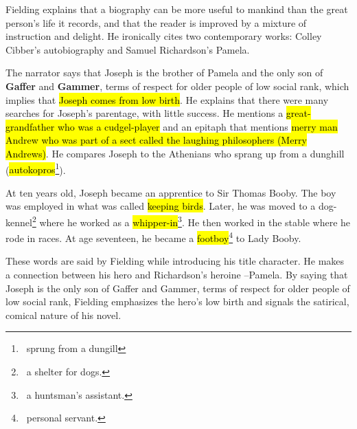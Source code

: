 \documentclass[12pt, a4paper]{article}
\begin{document}

Fielding explains that a biography can be more
useful to mankind than the great person's life it records, and that the reader is
improved by a mixture of instruction and delight. He ironically cites two contemporary works: 
Colley Cibber’s autobiography and Samuel Richardson’s Pamela.


\ind The narrator says that Joseph is the brother of Pamela and the only son of \textbf{Gaffer} and \textbf{Gammer},
terms of respect for older people of low social rank, which implies that \hl{Joseph comes from low birth}.
He explains that there were many searches for Joseph’s parentage, with little success. He mentions
a \hl{great-grandfather who was a cudgel-player} and an epitaph that mentions \hl{merry man Andrew 
who was part of a sect called the laughing philosophers (Merry Andrews)}. He compares Joseph 
to the Athenians who sprang up from a dunghill (\hl{autokopros}\footnote{\, sprung from a dungill}).


\ind At ten years old, Joseph became an apprentice to Sir Thomas Booby. The boy was employed in what 
was called \hl{keeping birds}. Later, he was moved to a dog-kennel\footnote{\, a shelter for dogs.
} where he worked as a \hl{whipper-in}\footnote{
\, a huntsman's assistant.}. He then worked in the stable where he rode in races. At age seventeen,
he became a \hl{footboy}\footnote{\, personal servant.} to Lady Booby.



These words are said by Fielding while introducing his title character.
He makes a connection between his hero and Richardson's heroine --Pamela.
By saying that Joseph is the only son of Gaffer and Gammer, terms of respect for
older people of low social rank, Fielding emphasizes the hero's low birth
and signals the satirical, comical nature of his novel.


\end{document}
